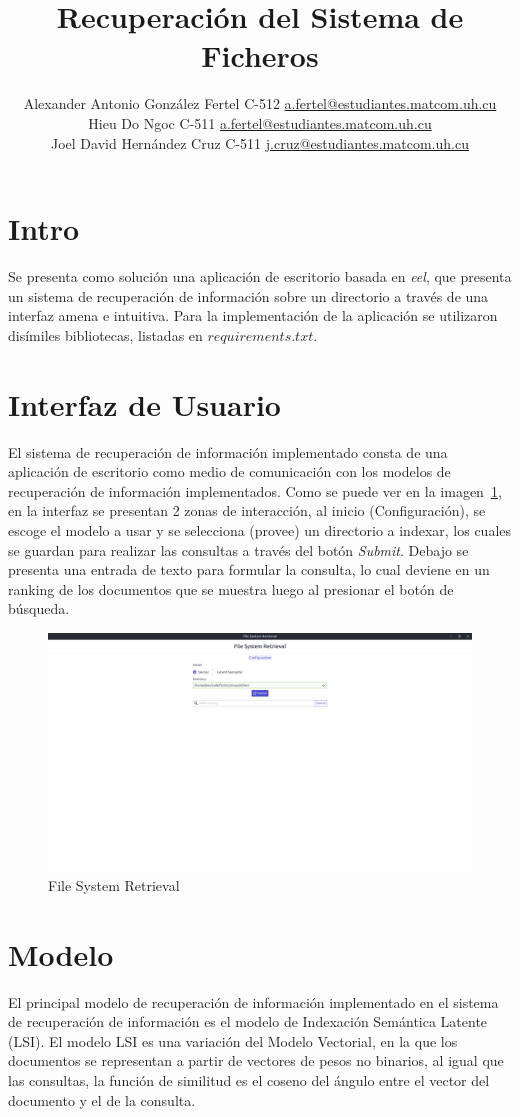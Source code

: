 \documentclass[a4paper, 10pt]{article}
\title{Recuperación del Sistema de Ficheros}
\author{Alexander Antonio González Fertel C-512 \hfill
		\href{mailto:a.fertel@estudiantes.matcom.uh.cu}{a.fertel@estudiantes.matcom.uh.cu}\\
		Hieu Do Ngoc C-511 \hfill
		\href{mailto:a.fertel@estudiantes.matcom.uh.cu}{a.fertel@estudiantes.matcom.uh.cu}\\
		Joel David Hernández Cruz C-511 \hfill
		\href{mailto:j.cruz@estudiantes.matcom.uh.cu}{j.cruz@estudiantes.matcom.uh.cu}}
\date{}
\begin{document}
	\maketitle
	\section{Intro}
	Se presenta como solución una aplicación de escritorio basada en \textit{eel}, que presenta un sistema
	de recuperación de información sobre un directorio a través de una interfaz amena e intuitiva.
	Para la implementación de la aplicación se utilizaron disímiles bibliotecas, listadas en $requirements.txt$. 

	\section{Interfaz de Usuario}
	El sistema de recuperación de información implementado consta de una aplicación de escritorio como medio de comunicación con los modelos
	de recuperación de información implementados. Como se puede ver en la imagen~\ref{fig:1}, en la interfaz se presentan 2 zonas de 
	interacción, al inicio (Configuración), se escoge el modelo a usar y se selecciona (provee) un directorio a indexar, los cuales
	se guardan para realizar las consultas a través del botón \textit{Submit}. Debajo se presenta una entrada
	de texto para formular la consulta, lo cual deviene en un ranking de los documentos que se muestra luego al presionar el botón
	de búsqueda.

	\begin{figure}[h]
		\centering
		\includegraphics[width=.6\textwidth]{images/app.png}			
		\caption{File System Retrieval}
		\label{fig:1}	
	\end{figure}

	\section{Modelo}
	El principal modelo de recuperaci\'on de informaci\'on implementado en el sistema de recuperaci\'on de informaci\'on es 
	el modelo de Indexaci\'on Sem\'antica Latente (LSI). El modelo LSI es una variación del Modelo Vectorial, en la que los
	documentos se representan a partir de vectores de pesos no binarios, al igual que las consultas, la función de similitud
	es el coseno del ángulo entre el vector del documento y el de la consulta.
\end{document}
